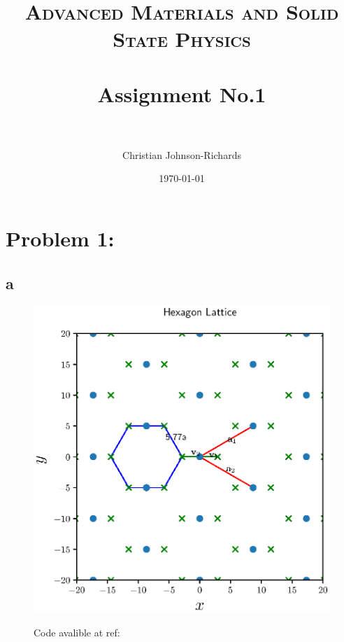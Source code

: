 \documentclass[paper=a4, fontsize=11pt]{scrartcl} %
\title{	
\normalfont \normalsize 
\textsc{Advanced Materials and Solid State Physics} \\ [25pt] %
\horrule{0.5pt} \\[0.4cm] %
\huge Assignment No.1 \\ %
\horrule{0.5pt} \\[0.5cm] %
}
\author{
Christian Johnson-Richards
} %
\date{\normalsize\today} %
\numberwithin{equation}{section} %
\numberwithin{figure}{section} %
\numberwithin{table}{section} %
\begin{document}
\maketitle %
\clearpage




\section{Problem 1:}

\subsection{a}

\begin{figure}
	\includegraphics[width=15cm]{Diagram}
	\label{Hexagon}
	\caption{Code avalible at ref: \cite{chriscrossing_materials-solidstate:_2017}}
\end{figure}






\small
\clearpage

\nocite{*}







\end{document}
